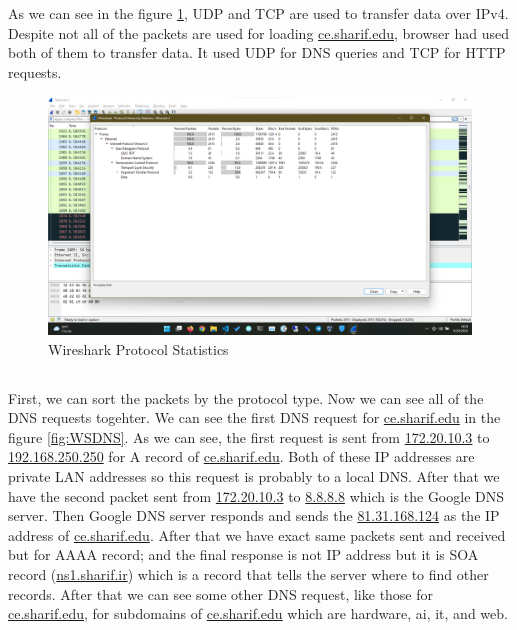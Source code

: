 \documentclass[en]{university}
\begin{document}
\setupdocument

\section{}
\subsection{}
As we can see in the figure \ref{fig:WSProtocolStat}, UDP and TCP are used to transfer data over IPv4. Despite not all of the packets are used for loading \url{ce.sharif.edu}, browser had used both of them to transfer data. It used UDP for DNS queries and TCP for HTTP requests.

\begin{figure}
    \centering
    \includegraphics[width=\textwidth]{./resources/WSProtocolStat.png}
    \caption{Wireshark Protocol Statistics}
    \label{fig:WSProtocolStat}
\end{figure}

\subsection{}
First, we can sort the packets by the protocol type. Now we can see all of the DNS requests togehter. We can see the first DNS request for \url{ce.sharif.edu} in the figure \ref{fig:WSDNS}. As we can see, the first request is sent from \url{172.20.10.3} to \url{192.168.250.250} for A record of \url{ce.sharif.edu}. Both of these IP addresses are private LAN addresses so this request is probably to a local DNS. After that we have the second packet sent from \url{172.20.10.3} to \url{8.8.8.8} which is the Google DNS server. Then Google DNS server responds and sends the \url{81.31.168.124} as the IP address of \url{ce.sharif.edu}. After that we have exact same packets sent and received but for AAAA record; and the final response is not IP address but it is SOA record (\url{ns1.sharif.ir}) which is a record that tells the server where to find other records. After that we can see some other DNS request, like those for \url{ce.sharif.edu}, for subdomains of \url{ce.sharif.edu} which are hardware, ai, it, and web. 
\end{document}
